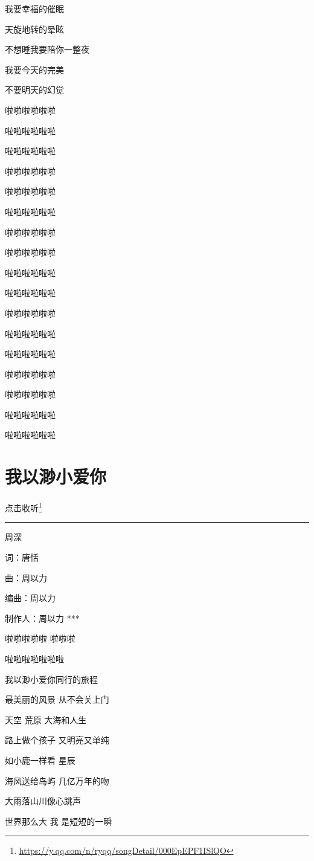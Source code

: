 \documentclass[]{ctexbook}
\renewcommand{\href}[2]{#2\footnote{\url{#1}}}
\begin{document}
我要幸福的催眠

天旋地转的晕眩

不想睡我要陪你一整夜

我要今天的完美

不要明天的幻觉

啦啦啦啦啦啦

啦啦啦啦啦啦

啦啦啦啦啦啦

啦啦啦啦啦啦

啦啦啦啦啦啦

啦啦啦啦啦啦

啦啦啦啦啦啦

啦啦啦啦啦啦

啦啦啦啦啦啦

啦啦啦啦啦啦

啦啦啦啦啦啦

啦啦啦啦啦啦

啦啦啦啦啦啦

啦啦啦啦啦啦

啦啦啦啦啦啦

啦啦啦啦啦啦

啦啦啦啦啦啦

\section*{我以渺小爱你}\label{loving-you-in-my-humble-way}


\href{https://y.qq.com/n/ryqq/songDetail/000EpEPF1ISlQO}{点击收听}

\begin{center}\rule{0.5\linewidth}{0.5pt}\end{center}

周深

词：唐恬

曲：周以力

编曲：周以力

制作人：周以力
***

啦啦啦啦啦 啦啦啦

啦啦啦啦啦啦啦

我以渺小爱你同行的旅程

最美丽的风景 从不会关上门

天空 荒原 大海和人生

路上做个孩子 又明亮又单纯

如小鹿一样看 星辰

海风送给岛屿 几亿万年的吻

大雨落山川像心跳声

世界那么大 我 是短短的一瞬
\end{document}
